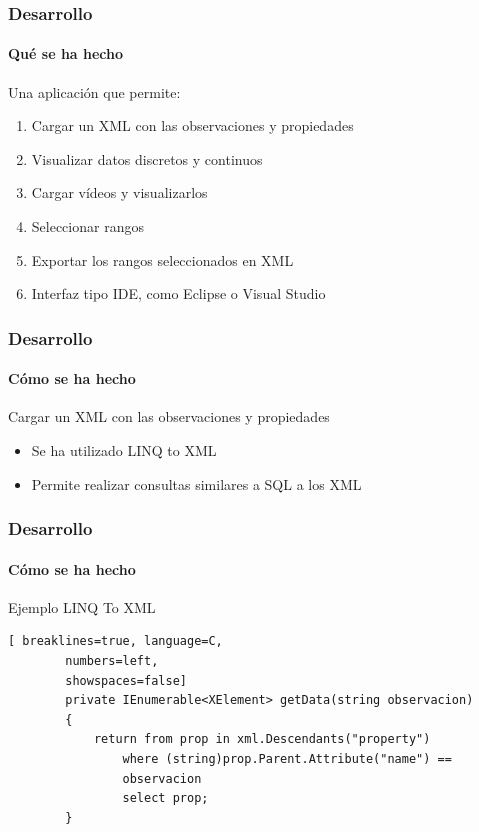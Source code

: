 \begin{frame}
	\frametitle{Desarrollo}
	\framesubtitle{Qu\'e se ha hecho}
	Una aplicaci\'on que permite:
	\begin{enumerate}
		\item Cargar un XML con las observaciones y propiedades
		\item Visualizar datos discretos y continuos
		\item Cargar v\'ideos y visualizarlos
		\item Seleccionar rangos
		\item Exportar los rangos seleccionados en XML
		\item Interfaz tipo IDE, como Eclipse o Visual 
		Studio
	\end{enumerate}
	
\end{frame}

\begin{frame}
    \frametitle{Desarrollo}
    \framesubtitle{C\'omo se ha hecho}
    \begin{block}{Cargar un XML con las observaciones y propiedades}
        
        \begin{itemize}
            \item Se ha utilizado LINQ to XML
            \item Permite realizar consultas similares a SQL a los XML
        \end{itemize}
        
    \end{block}
    
\end{frame}

\begin{frame}[fragile]
    \frametitle{Desarrollo}
    \framesubtitle{C\'omo se ha hecho}
    
    \begin{block}{Ejemplo LINQ To XML}
        \begin{lstlisting}[ breaklines=true, language=C, 
        numbers=left, 
        showspaces=false]
        private IEnumerable<XElement> getData(string observacion)
        {
            return from prop in xml.Descendants("property")
                where (string)prop.Parent.Attribute("name") == 
                observacion
                select prop;
        }
        \end{lstlisting}
    \end{block}
\end{frame}

